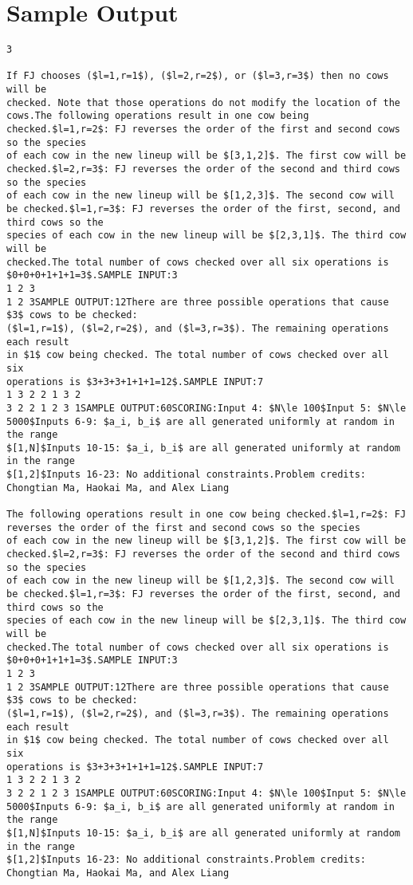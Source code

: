 \documentclass[12pt]{article}
\begin{document}
\section*{Sample Output}
\begin{verbatim}
3

If FJ chooses ($l=1,r=1$), ($l=2,r=2$), or ($l=3,r=3$) then no cows will be
checked. Note that those operations do not modify the location of the cows.The following operations result in one cow being checked.$l=1,r=2$: FJ reverses the order of the first and second cows so the species
of each cow in the new lineup will be $[3,1,2]$. The first cow will be checked.$l=2,r=3$: FJ reverses the order of the second and third cows so the species
of each cow in the new lineup will be $[1,2,3]$. The second cow will be checked.$l=1,r=3$: FJ reverses the order of the first, second, and third cows so the
species of each cow in the new lineup will be $[2,3,1]$. The third cow will be
checked.The total number of cows checked over all six operations is $0+0+0+1+1+1=3$.SAMPLE INPUT:3
1 2 3
1 2 3SAMPLE OUTPUT:12There are three possible operations that cause $3$ cows to be checked:
($l=1,r=1$), ($l=2,r=2$), and ($l=3,r=3$). The remaining operations each result
in $1$ cow being checked. The total number of cows checked over all six
operations is $3+3+3+1+1+1=12$.SAMPLE INPUT:7
1 3 2 2 1 3 2
3 2 2 1 2 3 1SAMPLE OUTPUT:60SCORING:Input 4: $N\le 100$Input 5: $N\le 5000$Inputs 6-9: $a_i, b_i$ are all generated uniformly at random in the range
$[1,N]$Inputs 10-15: $a_i, b_i$ are all generated uniformly at random in the range
$[1,2]$Inputs 16-23: No additional constraints.Problem credits: Chongtian Ma, Haokai Ma, and Alex Liang

The following operations result in one cow being checked.$l=1,r=2$: FJ reverses the order of the first and second cows so the species
of each cow in the new lineup will be $[3,1,2]$. The first cow will be checked.$l=2,r=3$: FJ reverses the order of the second and third cows so the species
of each cow in the new lineup will be $[1,2,3]$. The second cow will be checked.$l=1,r=3$: FJ reverses the order of the first, second, and third cows so the
species of each cow in the new lineup will be $[2,3,1]$. The third cow will be
checked.The total number of cows checked over all six operations is $0+0+0+1+1+1=3$.SAMPLE INPUT:3
1 2 3
1 2 3SAMPLE OUTPUT:12There are three possible operations that cause $3$ cows to be checked:
($l=1,r=1$), ($l=2,r=2$), and ($l=3,r=3$). The remaining operations each result
in $1$ cow being checked. The total number of cows checked over all six
operations is $3+3+3+1+1+1=12$.SAMPLE INPUT:7
1 3 2 2 1 3 2
3 2 2 1 2 3 1SAMPLE OUTPUT:60SCORING:Input 4: $N\le 100$Input 5: $N\le 5000$Inputs 6-9: $a_i, b_i$ are all generated uniformly at random in the range
$[1,N]$Inputs 10-15: $a_i, b_i$ are all generated uniformly at random in the range
$[1,2]$Inputs 16-23: No additional constraints.Problem credits: Chongtian Ma, Haokai Ma, and Alex Liang


\end{verbatim}
\end{document}
